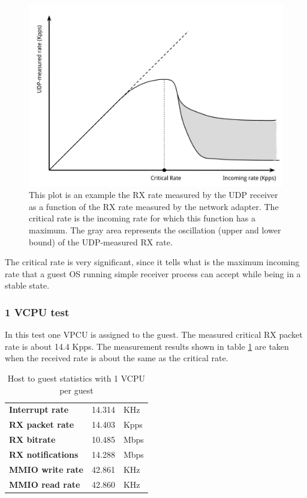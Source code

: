 \begin{figure}[bt]
\centering
\includegraphics[scale = 0.55]{critical-rate.pdf}
\caption{This plot is an example the RX rate measured by the UDP receiver as a function of the RX rate measured by the network adapter.
	 The critical rate is the incoming rate for which this function has a maximum. The gray area represents the oscillation (upper and
	 lower bound) of the UDP-measured RX rate.}
\label{fig:cr}
\end{figure}

\vspace{0.5cm}

The critical rate is very significant, since it tells what is the maximum incoming rate that a guest OS running simple receiver process can
accept while being in a stable state.


\subsubsection{1 VCPU test}
\label{sec:e1000-rx-g2h1vcpu}
In this test one VPCU is assigned to the guest. The measured critical RX packet rate is about 14.4 Kpps.
The measurement results shown in table \ref{tab:e1000-rx-g2h1vcpu} are taken when the received rate is about the same as the critical
rate.

\begin{table}
\begin{center}
\begin{tabular}{lrl}
\toprule
\textbf{Interrupt rate} & 14.314 & KHz\\
\textbf{RX packet rate} & 14.403 & Kpps\\
\textbf{RX bitrate} & 10.485 & Mbps\\
\textbf{RX notifications} & 14.288 & Mbps\\
\textbf{MMIO write rate} & 42.861 & KHz\\
\textbf{MMIO read rate} & 42.860 & KHz\\
\bottomrule
\end{tabular}
\end{center}
\caption[H2G with 1VCPU per guest]{Host to guest statistics with 1 VCPU per guest}
\label{tab:e1000-rx-g2h1vcpu}
\end{table}

